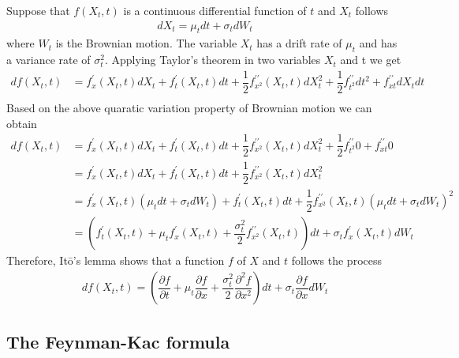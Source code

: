 Suppose that $f(X_t, t)$ is a continuous differential function of $t$ and $X_t$ follows 
\begin{align*}
dX_t=\mu_tdt+\sigma_tdW_t
\end{align*}
where $W_t$ is the Brownian motion. The variable $X_t$ has a drift rate of $\mu_t$ and has a variance rate of  $\sigma_t^2$. Applying Taylor's theorem in two variables $X_t$ and t we get
\begin{align*}
df(X_t,t)&=f^{\prime}_x(X_t,t)dX_t+f^{\prime}_t(X_t,t)dt+\dfrac{1}{2}f^{\prime \prime}_{x^2}(X_t,t)dX_t^2+\dfrac{1}{2}f^{\prime \prime}_{t^2}dt^2+f^{\prime \prime}_{xt}dX_tdt\\
\end{align*}
Based on the above quaratic variation property of Brownian motion we can obtain
\begin{align*}
df(X_t,t)&=f^{\prime}_x(X_t,t)dX_t+f^{\prime}_t(X_t,t)dt+\dfrac{1}{2}f^{\prime \prime}_{x^2}(X_t,t)dX_t^2+\dfrac{1}{2}f^{\prime \prime}_{t^2}0+f^{\prime \prime}_{xt}0\\
&=f^{\prime}_x(X_t,t)dX_t+f^{\prime}_t(X_t,t)dt+\dfrac{1}{2}f^{\prime \prime}_{x^2}(X_t,t)dX_t^2\\
&=f^\prime_x(X_t,t)(\mu_tdt+\sigma_tdW_t)+f^\prime_t(X_t,t)dt+\dfrac{1}{2}f^{\prime \prime}_{x^2}(X_t,t)(\mu_tdt+\sigma_tdW_t)^2\\
&=\left(f^\prime_t(X_t,t)+ \mu_tf^\prime_x(X_t,t)+\dfrac{\sigma_t^2}{2}f^{\prime \prime}_{x^2}(X_t,t)\right)dt+\sigma_t f^\prime_x(X_t,t)dW_t
\end{align*} 
Therefore, It\=o's lemma shows that a function $f$ of $X$ and $t$ follows the process 
\begin{align*}
df(X_t, t)=\left(\dfrac{\partial f}{\partial t}+\mu_t\dfrac{\partial f}{\partial x}+\dfrac{\sigma_t^2}{2}\dfrac{\partial^2 f}{\partial x^2}\right)dt+\sigma_t\dfrac{\partial f}{\partial x}dW_t
\end{align*}
\subsection{The Feynman-Kac formula}

